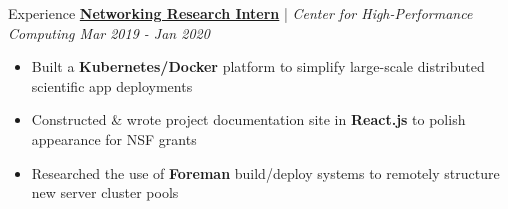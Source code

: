 \documentclass{content/resume/resume}
\begin{document}
\begin{rSection}{Experience}
  \href{https://slateci.io/}{\bf Networking Research Intern} | {\em Center for High-Performance Computing \hfill Mar 2019 - Jan 2020}
  \vspace{-6pt}
  \begin{itemize}[nosep]
    \item Built a {\bf Kubernetes/Docker} platform to simplify large-scale distributed scientific app deployments
    \item Constructed \& wrote project documentation site in {\bf React.js} to polish appearance for NSF grants
    \item Researched the use of {\bf Foreman} build/deploy systems to remotely structure new server cluster pools
  \end{itemize}
  
  

  

\end{rSection}
\end{document}
